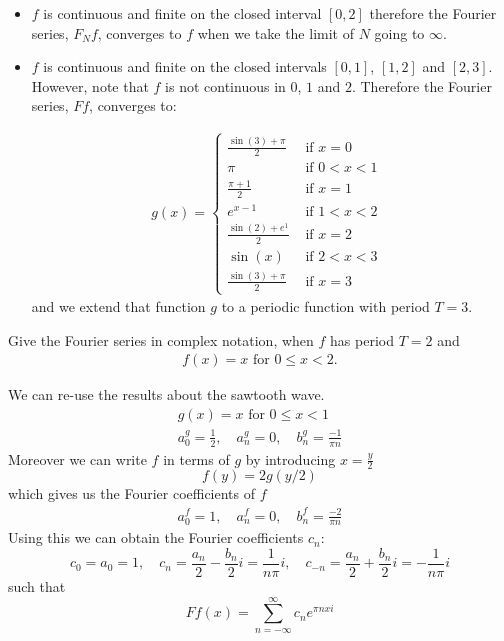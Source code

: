 \documentclass[11pt]{article}
\begin{document}
\begin{solution}     
\begin{itemize}
\item $f$ is continuous and finite on the closed interval $[0,2]$ therefore the Fourier series, $F_N f$, converges to $f$ when we take the limit of $N$ going to $\infty$.
\item $f$ is continuous and finite on the closed intervals $[0,1]$, $[1,2]$ and $[2,3]$. 
However, note that $f$ is not continuous in $0$, $1$ and $2$.
Therefore the Fourier series, $F f$, converges to: 

\begin{gather*}
            g(x) = \left\{\begin{array}{ll}
                            \frac{\sin(3) + \pi}{2} & \text{ if $x = 0$ }
						\\
                            \pi   & \text{ if $0 < x < 1$ }
                            \\
                            \frac{\pi + 1}{2} & \text{ if $x = 1$ }
						\\
                            e^{x-1} & \text{ if $1 < x < 2$ }
						\\
                            \frac{\sin(2) + e^1}{2} & \text{ if $x = 2$ }
						\\
                            \sin(x) & \text{ if $2 < x < 3$ }
						\\
                            \frac{\sin(3) + \pi}{2} & \text{ if $x = 3$ }
                          \end{array}\right.
\end{gather*}
and we extend that function $g$ to a periodic function with period $T = 3$. 
\end{itemize}
\end{solution}

\begin{exercise}
    Give the Fourier series in complex notation, when $f$ has period $T = 2$ and 
    \begin{gather*}
        f(x) = x \text{ for } 0 \leq x < 2.
    \end{gather*}
\end{exercise}
\begin{solution}     
We can re-use the results about the sawtooth wave.
\begin{gather*}
    g(x)=x \text { for } 0 \leq x<1
    \\
    a_0^g = \frac{1}{2},\quad a_n^g = 0, \quad b_n^g = \frac{-1}{\pi n}
\end{gather*}
Moreover we can write $f$ in terms of $g$ by introducing $x = \frac{y}{2}$
\[
    f(y) = 2g(y/2)
\]
which gives us the Fourier coefficients of $f$
\begin{gather*}
    a_0^f = 1,\quad a_n^f = 0, \quad b_n^f = \frac{-2}{\pi n}
\end{gather*}
Using this we can obtain the Fourier coefficients $c_n$:
\[
    c_0 = a_0 = 1,\quad c_n=\frac{a_n}{2}-\frac{b_n}{2} i = \frac{1}{n\pi}i, \quad c_{-n}=\frac{a_n}{2}+\frac{b_n}{2} i = -\frac{1}{n\pi}i
\]
such that 
\[
    F f(x)=\sum_{n=-\infty}^{\infty} c_n e^{\pi n x i}
\]
\end{solution}
\end{document}
